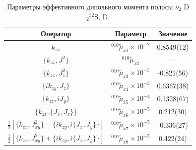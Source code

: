 \begin{table}[htbp]
\centering
\caption{Параметры эффективного дипольного момента полосы $\nu_2$ D$_2{}^{32}$S, D.}
\label{tab:d2s_dipole_parameters}
\small
\begin{tabular}{|c|c|c|}
\hline
Оператор & Параметр & Значение \\
\hline
$k_{zx}$ & ${}^{010}\widetilde{\mu}_{x1}\times10^{-2}$ & 0.8549(12) \\
$\{k_{zx},J^2\}$ & ${}^{010}\widetilde{\mu}_{x2}$ & -- \\
$\{k_{zx},J_z^2\}$ & ${}^{010}\widetilde{\mu}_{x3}\times10^{-5}$ & -0.821(56) \\
$\{ik_{zy},J_z\}$ & ${}^{010}\widetilde{\mu}_{x4}\times10^{-3}$ & 0.6367(38) \\
$\{k_{zz},iJ_y\}$ & ${}^{010}\widetilde{\mu}_{x5}\times10^{-4}$ & 0.1328(67) \\
$\{k_{zz},\{J_x,J_z\}\}$ & ${}^{010}\widetilde{\mu}_{x6}\times10^{-5}$ & 0.212(30) \\
$\frac{1}{2}[\{k_{zx},J_{xy}^2\}-\{ik_{zy},i\{J_x,J_y\}\}]$ & ${}^{010}\widetilde{\mu}_{x7}\times10^{-5}$ & -0.336(27) \\
$\frac{1}{2}[\{k_{zx},J_{xy}^2\}+\{ik_{zy},i\{J_x,J_y\}\}]$ & ${}^{010}\widetilde{\mu}_{x8}\times10^{-5}$ & 0.422(24) \\
\hline
\end{tabular}
\end{table}
